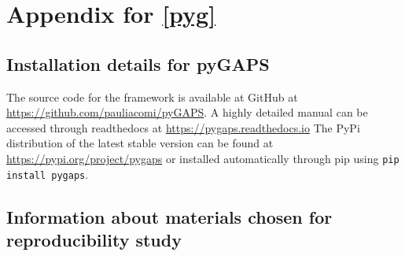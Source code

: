 
\graphicspath{ {\thisch/figures/} }

\chapter{Appendix for \autoref{pyg}}%
\label{appx:pyg}

\section{Installation details for pyGAPS}

The source code for the framework is available at GitHub
at \url{https://github.com/pauliacomi/pyGAPS}. A highly detailed 
manual can be accessed through readthedocs
at \url{https://pygaps.readthedocs.io}
The PyPi distribution of the latest stable version can be found at
\url{https://pypi.org/project/pygaps}
or installed automatically through pip using \lstinline{pip install pygaps}.

\section{Information about materials chosen for reproducibility study}

